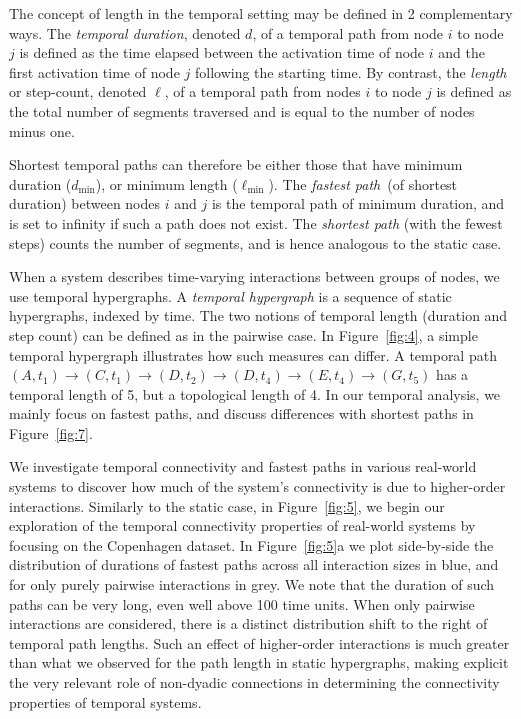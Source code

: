 \documentclass[a4paper,pre,reqno,superscriptaddress, twocolumn, floatfix]{revtex4}
\def\ho{higher-order }
\begin{document}
The concept of length in the temporal setting may be defined in 2 complementary ways. 
  The \textit{temporal duration}, denoted $d$, of a temporal path from node $i$ to node $j$ is defined as the time elapsed between the activation time of node $i$ and the first activation time of node $j$ following the starting time. 
  By contrast, the \textit{length} or step-count, denoted $\ell$, of a temporal path from nodes $i$ to node $j$ is defined as the total number of segments traversed and is equal to the number of nodes minus one. 


Shortest temporal paths can therefore be either those that have minimum duration ($d_{\min}$), or minimum length ($\ell_{\min}$). 
The \textit{fastest path}~(of shortest duration) between nodes $i$ and $j$ is the temporal path of minimum duration, and is set to infinity if such a path does not exist. The \textit{shortest path} (with the fewest steps) counts the number of segments, and is hence analogous to the static case. 

	

When a system describes time-varying interactions between groups of nodes, we use temporal hypergraphs. A \textit{temporal hypergraph} is a sequence of static hypergraphs, indexed by time. The two notions of temporal length (duration and step count) can be defined as in the pairwise case. 
In Figure~\ref{fig:4}, a simple temporal hypergraph illustrates how such measures can differ. A temporal path 
$(A,t_1)\to(C,t_1)\to(D,t_2)\to(D,t_4)\to(E,t_4)\to(G,t_5)$ has a temporal length of 5, but a topological length of 4. In our temporal analysis, we mainly focus on fastest paths, and discuss differences with shortest paths in Figure~\ref{fig:7}. 


We investigate temporal connectivity and fastest paths in various real-world systems to discover how much of the system's connectivity is due to \ho interactions. Similarly to the static case, in Figure~\ref{fig:5}, we begin our exploration of the temporal connectivity properties of real-world systems by focusing on the Copenhagen dataset. In Figure~\ref{fig:5}a we plot side-by-side the distribution of durations of fastest paths across all interaction sizes in blue, and for only purely pairwise interactions in grey. 
We note that the duration of such paths can be very long, even well above 100 time units.
When only pairwise interactions are considered, there is a distinct distribution shift to the right of temporal path lengths. Such an effect of \ho interactions is much greater than what we observed for the path length in static hypergraphs, making explicit the very relevant role of non-dyadic connections in determining the connectivity properties of temporal systems. 
\end{document}
